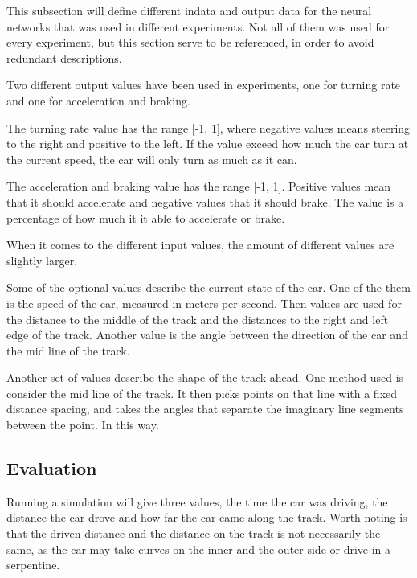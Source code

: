 This subsection will define different indata and output data for the neural networks that was used in different experiments. Not all of them was used for every experiment, but this section serve to be referenced, in order to avoid redundant descriptions.

Two different output values have been used in experiments, one for turning rate and one for acceleration and braking. 

The turning rate value has the range [-1, 1], where negative values means steering to the right and positive to the left. If the value exceed how much the car turn at the current speed, the car will only turn as much as it can.

The acceleration and braking value has the range [-1, 1]. Positive values mean that it should accelerate and negative values that it should brake. The value is a percentage of how much it it able to accelerate or brake.

When it comes to the different input values, the amount of different values are slightly larger.

Some of the optional values describe the current state of the car. One of the them is the speed of the car, measured in meters per second. Then values are used for the distance to the middle of the track and the distances to the right and left edge of the track. Another value is the angle between the direction of the car and the mid line of the track.

Another set of values describe the shape of the track ahead. One method used is consider the mid line of the track. It then picks points on that line with a fixed distance spacing, and takes the angles that separate the imaginary line segments between the point. In this way.


\subsection{Evaluation}

Running a simulation will give three values, the time the car was driving, the distance the car drove and how far the car came along the track. Worth noting is that the driven distance and the distance on the track is not necessarily the same, as the car may take curves on the inner and the outer side or drive in a serpentine.

